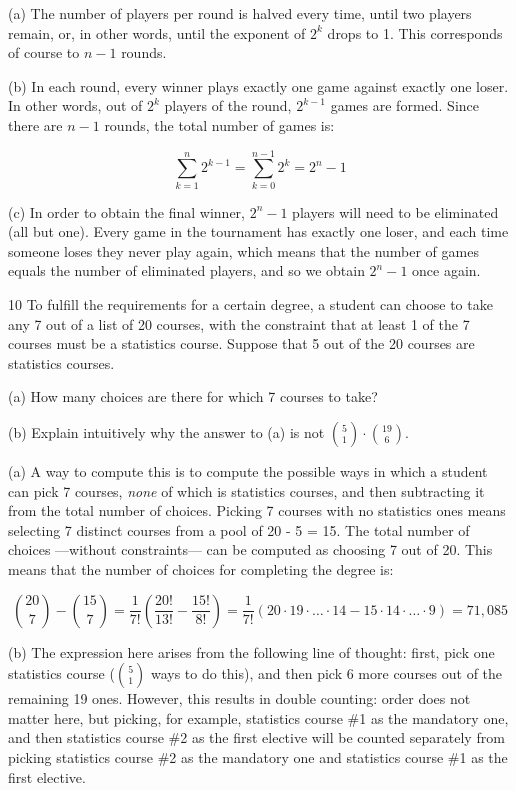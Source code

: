 \begin{solution}
    
    (a) The number of players per round is halved every time, until two players remain, or, in other words, until the exponent of $2^k$ drops to 1.
    This corresponds of course to $n - 1$ rounds.

    (b) In each round, every winner plays exactly one game against exactly one loser.
    In other words, out of $2^k$ players of the round, $2^{k-1}$ games are formed.
    Since there are $n - 1$ rounds, the total number of games is:

    \[\sum_{k=1}^{n} 2^{k - 1} = \sum_{k=0}^{n-1}2^k = 2^{n} - 1\]

    (c) In order to obtain the final winner, $2^{n} - 1$ players will need to be eliminated (all but one).
    Every game in the tournament has exactly one loser, and each time someone loses they never play again, which means that the number of games equals the number of eliminated players, and so we obtain $2^{n} - 1$ once again.
\end{solution}

\begin{exercise}{10}
    To fulfill the requirements for a certain degree, a student can choose to take any 7 out of a list of 20 courses, with the constraint that at least 1 of the 7 courses must be a statistics course.
    Suppose that 5 out of the 20 courses are statistics courses.

    (a) How many choices are there for which 7 courses to take?

    (b) Explain intuitively why the answer to (a) is not $\binom{5}{1} \cdot \binom{19}{6}$.
\end{exercise}

\begin{solution}
    
    (a) A way to compute this is to compute the possible ways in which a student can pick 7 courses, \textit{none} of which is statistics courses, and then subtracting it from the total number of choices.
    Picking 7 courses with no statistics ones means selecting 7 distinct courses from a pool of 20 - 5 = 15.
    The total number of choices ---without constraints--- can be computed as choosing 7 out of 20.
    This means that the number of choices for completing the degree is:

    \[\binom{20}{7} - \binom{15}{7} = \frac{1}{7!}(\frac{20!}{13!} - \frac{15!}{8!}) = \frac{1}{7!}(20 \cdot 19 \cdot \ldots \cdot 14 - 15 \cdot 14 \cdot \ldots \cdot 9) = 71,085\]

    (b) The expression here arises from the following line of thought: first, pick one statistics course ($\binom{5}{1}$ ways to do this), and then pick 6 more courses out of the remaining 19 ones.
    However, this results in double counting: order does not matter here, but picking, for example, statistics course \#1 as the mandatory one, and then statistics course \#2 as the first elective will be counted separately from picking statistics course \#2 as the mandatory one and statistics course \#1 as the first elective.
\end{solution}

